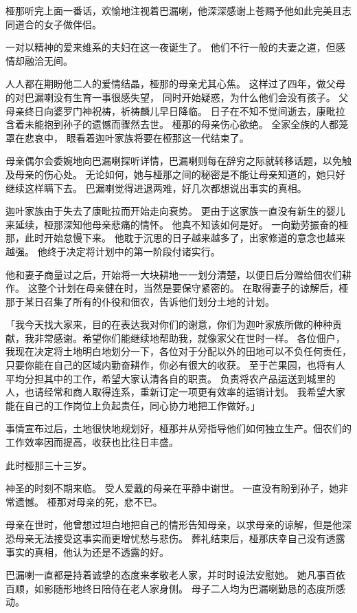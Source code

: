 \documentclass[twoside,openany]{book}
\begin{document}
桠那听完上面一番话，欢愉地注视着巴漏喇，他深深感谢上苍赐予他如此完美且志同道合的女子做伴侣。

一对以精神的爱来维系的夫妇在这一夜诞生了。
他们不行一般的夫妻之道，但感情却融洽无间。

人人都在期盼他二人的爱情结晶，桠那的母亲尤其心焦。
这样过了四年，做父母的对巴漏喇没有生育一事很感失望，
 同时开始疑惑，为什么他们会没有孩子。
父母亲终日向婆罗门神祝祷，祈祷麟儿早日降临。
日子在不知不觉间逝去，康毗拉含着未能抱到孙子的遗憾而骤然去世。
桠那的母亲伤心欲绝。
全家全族的人都笼罩在悲哀中，
眼看着迦叶家族将要在桠那这一代结束了。

母亲偶尔会委婉地向巴漏喇探听详情，巴漏喇则每在辞穷之际就转移话题，以免触及母亲的伤心处。
无论如何，她与桠那之间的秘密是不能让母亲知道的，她只好继续这样瞒下去。
巴漏喇觉得进退两难，好几次都想说出事实的真相。

迦叶家族由于失去了康毗拉而开始走向衰势。
更由于这家族一直没有新生的婴儿来延续，桠那深知他母亲悲痛的情怀。
他真不知该如何是好。
一向勤劳振奋的桠那，此时开始怠慢下来。
他耽于沉思的日子越来越多了，出家修道的意念也越来越强。
他终于决定将计划中的第一阶段付诸实行。

他和妻子商量过之后，开始将一大块耕地一一划分清楚，以便日后分赠给佃农们耕作。
这整个计划在母亲健在时，当然是要保守紧密的。
在取得妻子的谅解后，桠那于某日召集了所有的仆役和佃农，告诉他们划分土地的计划。

「我今天找大家来，目的在表达我对你们的谢意，你们为迦叶家族所做的种种贡献，我非常感谢。希望你们能继续地帮助我，就像家父在世时一样。
各位佃户，我现在决定将土地明白地划分一下，各位对于分配以外的田地可以不负任何责任，只要你能在自己的区域内勤奋耕作，你必有很大的收获。
至于芒果园，也将有人平均分担其中的工作，希望大家认清各自的职责。
负责将农产品运送到城里的人，也请经常和商人取得连系，重新订定一项更有效率的运销计划。
我希望大家能在自己的工作岗位上负起责任，同心协力地把工作做好。」

事情宣布过后，土地很快地规划好，桠那并从旁指导他们如何独立生产。佃农们的工作效率因而提高，收获也比往日丰盛。

此时桠那三十三岁。

神圣的时刻不期来临。
受人爱戴的母亲在平静中谢世。
一直没有盼到孙子，她非常遗憾。
桠那对母亲的死，悲不已。

母亲在世时，他曾想过坦白地把自己的情形告知母亲，以求母亲的谅解，但是他深恐母亲无法接受这事实而更增忧愁与悲伤。
葬礼结束后，桠那庆幸自己没有透露事实的真相，他认为还是不透露的好。

巴漏喇一直都是持着诚挚的态度来孝敬老人家，并时时设法安慰她。
她凡事百依百顺，如影随形地终日陪侍在老人家身侧。
母子二人均为巴漏喇勤恳的态度所感动。
\end{document}
